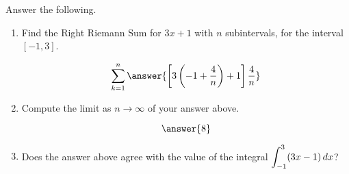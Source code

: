\documentclass{ximera}
\author{Gregory Hartman \and Matthew Carr}
\begin{document}
\begin{exercise}


Answer the following.

\begin{enumerate}
\item Find the Right Riemann Sum for $3x+1$ with $n$ subintervals, for the interval $[-1,3]$.
\begin{prompt}
\[
\sum_{k=1}^n \answer{\left[3\left(-1+\frac{4}{n}\right)+1\right]\frac{4}{n}}
\]
\end{prompt}
\item Compute the limit as $n\to\infty$ of your answer above. \begin{prompt} \[\answer{8}\]
\end{prompt}
\item Does the answer above agree with the value of the integral
  $\displaystyle \int_{-1}^{3}(3x-1)\mathop{}\!d x$? \begin{multipleChoice}
   
\end{multipleChoice}
\end{enumerate}
\end{exercise}
\end{document}
